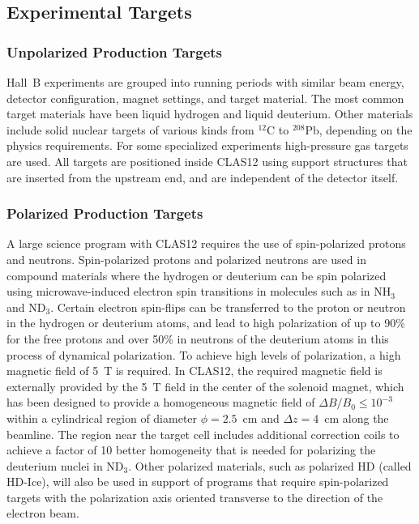\documentclass[final,3p,twocolumn]{elsarticle}
\begin{document}
\subsection{Experimental Targets}

\subsubsection{Unpolarized Production Targets} 

Hall~B experiments are grouped into running periods with similar beam energy, detector configuration, magnet
settings, and target material. The most common target materials have been liquid hydrogen and liquid deuterium.
Other materials include solid nuclear targets of various kinds from $^{12}$C to $^{208}$Pb, depending on the physics
requirements. For some specialized experiments high-pressure gas targets are used. All targets are positioned
inside CLAS12 using support structures that are inserted from the upstream end, and are independent of the
detector itself. 


\subsubsection{Polarized Production Targets} 

A large science program with CLAS12 requires the use of spin-polarized protons and neutrons. Spin-polarized
protons and polarized neutrons are used in compound materials where the hydrogen or deuterium can be spin
polarized using microwave-induced electron spin transitions in molecules such as in NH$_3$ and ND$_3$. Certain
electron spin-flips can be transferred to the proton or neutron in the hydrogen or deuterium atoms, and lead to high
polarization of up to 90\% for the free protons and over 50\% in neutrons of the deuterium atoms in this process
of dynamical polarization. To achieve high levels of polarization, a high magnetic field of 5~T is required. In CLAS12,
the required magnetic field is externally provided by the 5~T field in the center of the solenoid magnet, which has
been designed to provide a homogeneous magnetic field of $\Delta B / B_0 \leq 10^{-3}$ within a cylindrical region
of diameter $\phi = 2.5$~cm and $\Delta{z} = 4$~cm along the beamline.  The region near the target cell includes
additional correction coils to achieve a factor of 10 better homogeneity that is needed for polarizing the deuterium
nuclei in ND$_3$. Other polarized materials, such as polarized HD (called HD-Ice), will also be used in support of
programs that require spin-polarized targets with the polarization axis oriented transverse to the direction of the
electron beam.        
\end{document}

